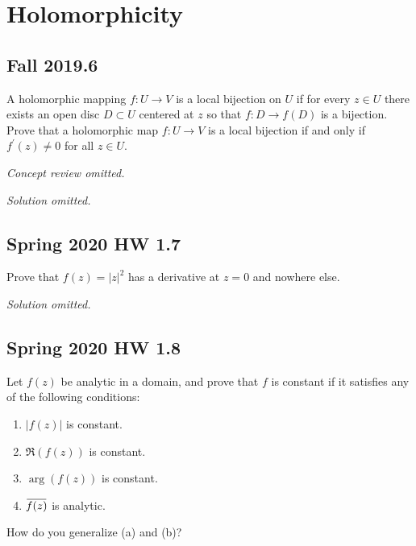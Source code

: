 \hypertarget{holomorphicity}{%
\section{Holomorphicity}\label{holomorphicity}}

\hypertarget{fall-2019.6}{%
\subsection{Fall 2019.6}\label{fall-2019.6}}

\begin{problem}[?]

A holomorphic mapping \(f: U \rightarrow V\) is a local bijection on
\(U\) if for every \(z \in U\) there exists an open disc \(D \subset U\)
centered at \(z\) so that \(f: D \rightarrow f(D)\) is a bijection.
Prove that a holomorphic map \(f: U \rightarrow V\) is a local bijection
if and only if \(f^{\prime}(z) \neq 0\) for all \(z \in U\).

\end{problem}

\emph{Concept review omitted.}

\emph{Solution omitted.}

\hypertarget{spring-2020-hw-1.7}{%
\subsection{Spring 2020 HW 1.7}\label{spring-2020-hw-1.7}}

\begin{problem}[?]

Prove that \(f(z) = {\left\lvert {z} \right\rvert}^2\) has a derivative
at \(z=0\) and nowhere else.

\end{problem}

\emph{Solution omitted.}

\hypertarget{spring-2020-hw-1.8}{%
\subsection{Spring 2020 HW 1.8}\label{spring-2020-hw-1.8}}

\begin{problem}[?]

Let \(f(z)\) be analytic in a domain, and prove that \(f\) is constant
if it satisfies any of the following conditions:

\begin{enumerate}
\def\labelenumi{\alph{enumi}.}
\tightlist
\item
  \({\left\lvert {f(z)} \right\rvert}\) is constant.
\item
  \(\Re(f(z))\) is constant.
\item
  \(\arg(f(z))\) is constant.
\item
  \(\mkern 1.5mu\overline{\mkern-1.5muf(z)\mkern-1.5mu}\mkern 1.5mu\) is
  analytic.
\end{enumerate}

How do you generalize (a) and (b)?

\end{problem}

